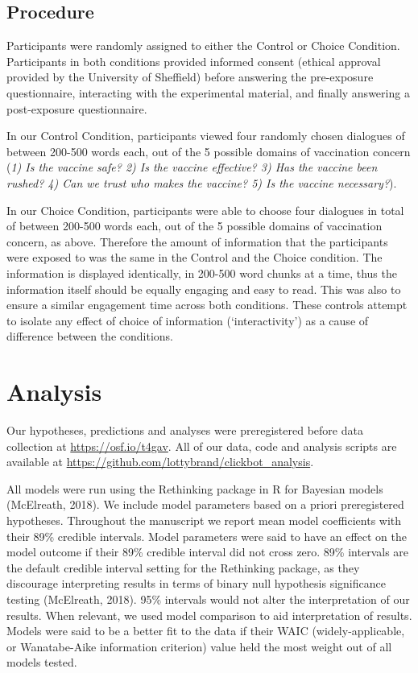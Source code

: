 \documentclass[
  english,
  ,jou,floatsintext]{apa6}
\begin{document}
\hypertarget{procedure}{%
\subsection{Procedure}\label{procedure}}

Participants were randomly assigned to either the Control or Choice Condition. Participants in both conditions provided informed consent (ethical approval provided by the University of Sheffield) before answering the pre-exposure questionnaire, interacting with the experimental material, and finally answering a post-exposure questionnaire.

In our Control Condition, participants viewed four randomly chosen dialogues of between 200-500 words each, out of the 5 possible domains of vaccination concern (\emph{1) Is the vaccine safe? 2) Is the vaccine effective? 3) Has the vaccine been rushed? 4) Can we trust who makes the vaccine? 5) Is the vaccine necessary?}).

In our Choice Condition, participants were able to choose four dialogues in total of between 200-500 words each, out of the 5 possible domains of vaccination concern, as above. Therefore the amount of information that the participants were exposed to was the same in the Control and the Choice condition. The information is displayed identically, in 200-500 word chunks at a time, thus the information itself should be equally engaging and easy to read. This was also to ensure a similar engagement time across both conditions. These controls attempt to isolate any effect of choice of information (`interactivity') as a cause of difference between the conditions.

\hypertarget{analysis}{%
\section{Analysis}\label{analysis}}

Our hypotheses, predictions and analyses were preregistered before data collection at \url{https://osf.io/t4gav}. All of our data, code and analysis scripts are available at \url{https://github.com/lottybrand/clickbot_analysis}.

All models were run using the Rethinking package in R for Bayesian models (McElreath, 2018). We include model parameters based on a priori preregistered hypotheses. Throughout the manuscript we report mean model coefficients with their 89\% credible intervals. Model parameters were said to have an effect on the model outcome if their 89\% credible interval did not cross zero. 89\% intervals are the default credible interval setting for the Rethinking package, as they discourage interpreting results in terms of binary null hypothesis significance testing (McElreath, 2018). 95\% intervals would not alter the interpretation of our results. When relevant, we used model comparison to aid interpretation of results. Models were said to be a better fit to the data if their WAIC (widely-applicable, or Wanatabe-Aike information criterion) value held the most weight out of all models tested.
\end{document}
